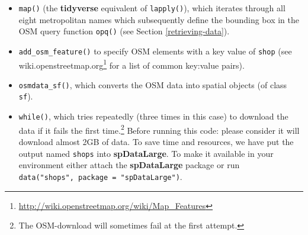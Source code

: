 \documentclass[]{krantz}
\newenvironment{Shaded}{\begin{snugshade}}{\end{snugshade}}
\newcommand{\CharTok}[1]{\textcolor[rgb]{0.5,0.5,0.5}{#1}}
\newcommand{\CommentTok}[1]{\textcolor[rgb]{0.37,0.37,0.37}{\textit{#1}}}
\newcommand{\ControlFlowTok}[1]{\textcolor[rgb]{0.27,0.27,0.27}{\textbf{#1}}}
\newcommand{\DataTypeTok}[1]{\textcolor[rgb]{0.27,0.27,0.27}{#1}}
\newcommand{\DecValTok}[1]{\textcolor[rgb]{0.06,0.06,0.06}{#1}}
\newcommand{\FloatTok}[1]{\textcolor[rgb]{0.06,0.06,0.06}{#1}}
\newcommand{\KeywordTok}[1]{\textcolor[rgb]{0.27,0.27,0.27}{\textbf{#1}}}
\newcommand{\NormalTok}[1]{#1}
\newcommand{\OperatorTok}[1]{\textcolor[rgb]{0.43,0.43,0.43}{\textbf{#1}}}
\newcommand{\StringTok}[1]{\textcolor[rgb]{0.5,0.5,0.5}{#1}}
\providecommand{\tightlist}{%
  \setlength{\itemsep}{0pt}\setlength{\parskip}{0pt}}
\let\rmarkdownfootnote\footnote%
\def\footnote{\protect\rmarkdownfootnote}
\renewcommand{\href}[2]{#2\footnote{\url{#1}}}
\begin{document}
\begin{itemize}
\tightlist
\item
  \texttt{map()} (the \textbf{tidyverse} equivalent of \texttt{lapply()}), which iterates through all eight metropolitan names which subsequently define the bounding box in the OSM query function \texttt{opq()} (see Section \ref{retrieving-data}).
\item
  \texttt{add\_osm\_feature()} to specify OSM elements with a key value of \texttt{shop} (see \href{http://wiki.openstreetmap.org/wiki/Map_Features}{wiki.openstreetmap.org} for a list of common key:value pairs).
\item
  \texttt{osmdata\_sf()}, which converts the OSM data into spatial objects (of class \texttt{sf}).
\item
  \texttt{while()}, which tries repeatedly (three times in this case) to download the data if it fails the first time.\footnote{The OSM-download will sometimes fail at the first attempt.}
  Before running this code: please consider it will download almost 2GB of data.
  To save time and resources, we have put the output named \texttt{shops} into \textbf{spDataLarge}.
  To make it available in your environment either attach the \textbf{spDataLarge} package or run \texttt{data("shops",\ package\ =\ "spDataLarge")}.
\end{itemize}

\begin{Shaded}
\end{Shaded}
\end{document}
